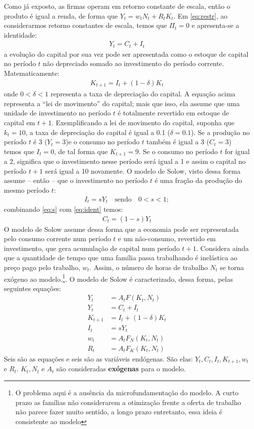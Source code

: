 \documentclass[11pt,a4paper]{article}
\begin{document}
Como já exposto, as firmas operam em retorno constante de escala, então o produto é igual a renda, de forma que $Y_t = w_t N_t + R_t K_t$. Em \ref{eq:restr}, ao considerarmos retorno constantes de escala, temos que $\Pi_t = 0$ e apresenta-se a identidade:
\begin{align} \label{eq:ident}
Y_t = C_t + I_t
\end{align}
\noindent
a evolução do capital por sua vez pode ser apresentada como o estoque de capital no período $t$ não depreciado somado ao investimento do período corrente. Matematicamente:
\begin{align}
K_{t+1} = I_t + (1 - \delta)K_t
\end{align}
\noindent
onde $0<\delta<1$ representa a taxa de depreciação do capital. A equação acima representa a ``lei de movimento'' do capital; mais que isso, ela assume que uma unidade de investimento no período $t$ é totalmente revertido em estoque de capital em $t+1$. Exemplificando a lei de movimento do capital, suponha que $k_t = 10$, a taxa de depreciação do capital é igual a 0.1 ($\delta = 0.1$). Se a produção no período $t$ é 3 ($Y_t = 3$)e o consumo no período $t$ também é igual a 3 ($C_t = 3$) temos que $I_t = 0$, de tal forma que $K_{t+1} = 9$. Se o consumo no período $t$ for igual a 2, significa que o investimento nesse período será igual a 1 e assim o capital no período $t+1$ será igual a 10 novamente. O modelo de Solow, visto dessa forma assume -- então -- que o investimento no período $t$ é uma fração da produção do mesmo período $t$:
\begin{align} \label{eq:s}
I_t = s Y_t \quad \text{sendo} \quad 0 < s < 1;
\end{align} 
\noindent
combinando \ref{eq:s} com \ref{eq:ident} temos:
\begin{align}
C_t = (1-s)Y_t
\end{align}
O modelo de Solow assume dessa forma que a economia pode ser representada pelo consumo corrente num período $t$ e um não-consumo, revertido em investimento, que gera acumulação de capital num período $t+1$. Considera ainda que a quantidade de tempo que uma família passa trabalhando é inelástica ao preço pago pelo trabalho, $w_t$. Assim, o número de horas de trabalho $N_t$ se torna exógeno ao modelo.\footnote{O problema aqui é a ausência da microfundamentação do modelo. A curto prazo as famílias não considerarem a otimização frente a oferta de trabalho não parece fazer muito sentido, a longo prazo entretanto, essa ideia é consistente ao modelo}. O modelo de Solow é caracterizado, dessa forma, pelas seguintes equações:
\begin{align}
Y_t &= A_t F(K_t, N_t)\\
Y_t &= C_t + I_t\\
K_{t+1} &= I_t + (1-\delta)K_t\\
I_t &= sY_t\\
w_t &= A_t F_N(K_t, N_t)\\
R_t &= A_t F_K(K_t, N_t)
\end{align}  
Seis são as equações e seis são as variáveis endógenas. São elas: $Y_t, C_t, I_t, K_{t+1}, w_t$ e $R_t$. $K_t, N_t$ e $A_t$ são consideradas \textbf{exógenas} para o modelo.





 
\end{document}
